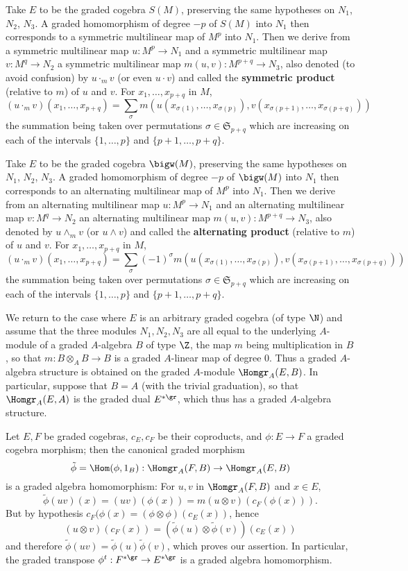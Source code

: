 \begin{example}
Take $E$ to be the graded cogebra $S(M)$, preserving the same hypotheses on $N_1$, $N_2$, $N_3$. A graded homomorphism of degree $-p$ of $S(M)$ into $N_1$ then corresponds to a symmetric multilinear map of $M^p$ into $N_1$. Then we derive from a symmetric multilinear map $u:M^p\to N_1$ and a symmetric multilinear map $v:M^q\to N_2$ a symmetric multilinear map $m(u,v):M^{p+q}\to N_3$, also denoted (to avoid confusion) by $u\cdot_m v$ (or even $u\cdot v$) and called the \textbf{symmetric product} (relative to $m$) of $u$ and $v$. For $x_1,\dots,x_{p+q}$ in $M$,
\[(u\cdot_m v)(x_1,\dots,x_{p+q})=\sum_\sigma m(u(x_{\sigma(1)},\dots,x_{\sigma(p)}),v(x_{\sigma(p+1)},\dots,x_{\sigma(p+q)}))\]
the summation being taken over permutations $\sigma\in\mathfrak{S}_{p+q}$ which are increasing on each of the intervals $\{1,\dots,p\}$ and $\{p+1,\dots,p+q\}$.
\end{example}
\begin{example}
Take $E$ to be the graded cogebra $\bigw(M)$, preserving the same hypotheses on $N_1$, $N_2$, $N_3$. A graded homomorphism of degree $-p$ of $\bigw(M)$ into $N_1$ then corresponds to an alternating multilinear map of $M^p$ into $N_1$. Then we derive from an alternating multilinear map $u:M^p\to N_1$ and an alternating multilinear map $v:M^q\to N_2$ an alternating multilinear map $m(u,v):M^{p+q}\to N_3$, also denoted by $u\wedge_m v$ (or $u\wedge v$) and called the \textbf{alternating product} (relative to $m$) of $u$ and $v$. For $x_1,\dots,x_{p+q}$ in $M$,
\[(u\cdot_m v)(x_1,\dots,x_{p+q})=\sum_\sigma(-1)^\sigma m(u(x_{\sigma(1)},\dots,x_{\sigma(p)}),v(x_{\sigma(p+1)},\dots,x_{\sigma(p+q)}))\]
the summation being taken over permutations $\sigma\in\mathfrak{S}_{p+q}$ which are increasing on each of the intervals $\{1,\dots,p\}$ and $\{p+1,\dots,p+q\}$.
\end{example}
We return to the case where $E$ is an arbitrary graded cogebra (of type $\N$) and assume that the three modules $N_1,N_2,N_3$ are all equal to the underlying $A$-module of a graded $A$-algebra $B$ of type $\Z$, the map $m$ being multiplication in $B$, so that $m:B\otimes_AB\to B$ is a graded $A$-linear map of degree $0$. Thus a graded $A$-algebra structure is obtained on the graded $A$-module $\Homgr_A(E,B)$. In particular, suppose that $B=A$ (with the trivial graduation), so that $\Homgr_A(E,A)$ is the graded dual $E^{*\gr}$, which thus has a graded $A$-algebra structure.
\begin{example}
Let $E,F$ be graded cogebras, $c_E,c_F$ be their coproducts, and $\phi:E\to F$ a graded cogebra morphism; then the canonical graded morphism
\[\tilde{\phi}=\Hom(\phi,1_B):\Homgr_A(F,B)\to\Homgr_A(E,B)\]
is a graded algebra homomorphism: For $u,v$ in $\Homgr_A(F,B)$ and $x\in E$,
\[\tilde{\phi}(uv)(x)=(uv)(\phi(x))=m(u\otimes v)(c_F(\phi(x))).\]
But by hypothesis $c_F(\phi(x)=(\phi\otimes\phi)(c_E(x))$, hence\
\[(u\otimes v)(c_F(x))=(\tilde{\phi}(u)\otimes\tilde{\phi}(v))(c_E(x))\]
and therefore $\tilde{\phi}(uv)=\tilde{\phi}(u)\tilde{\phi}(v)$, which proves our assertion. In particular, the graded transpose $\phi^t:F^{*\gr}\to E^{*\gr}$ is a graded algebra homomorphism.
\end{example}
